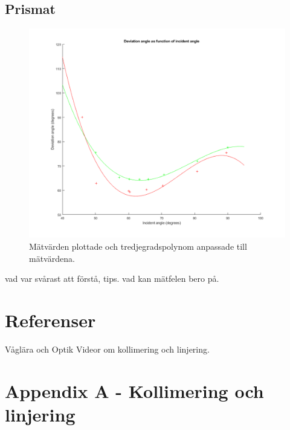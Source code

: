 \documentclass[a4paper]{article}
\begin{document}
\subsection{Prismat}
\begin{figure}[h]
    \caption{Mätvärden plottade och tredjegradspolynom anpassade till mätvärdena.}
    \centering
    \includegraphics[width=\textwidth]{graph}
\end{figure}
vad var svårast att förstå, tips. vad kan mätfelen bero på.

\section{Referenser}
Våglära och Optik
Videor om kollimering och linjering. 

\section{Appendix A - Kollimering och linjering}
\end{document}
